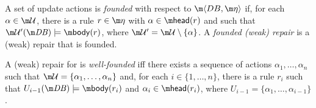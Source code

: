 \begin{definition}
 A set of update actions \UU is \emph{founded} with respect to $\fulldb$ if, for each $\alpha \in \UU$, there is a rule  $r\in \aics$ with $\alpha\in\head(r)$ and such that $\UU'(\db)\models \body(r)$, where $\UU'=\UU\setminus\{\alpha\}$. A \emph{founded (weak) repair} is a (weak) repair that is founded.
\end{definition}

\begin{definition}
 A (weak) repair \UU for \fulldb is \emph{well-founded} iff there exists a sequence of actions $\alpha_1,\dots,\alpha_n$ such that $\UU=\{\alpha_1,\dots,\alpha_n\}$ and, for each $i\in\{1,\dots,n\}$, there is a rule $r_i$ such that $U_{i-1}(\db) \models \body (r_i)$ and $\alpha_i \in \head(r_i)$, where $U_{i-1} = \{\alpha_1,\dots,\alpha_{i-1}\}$.
\end{definition}

